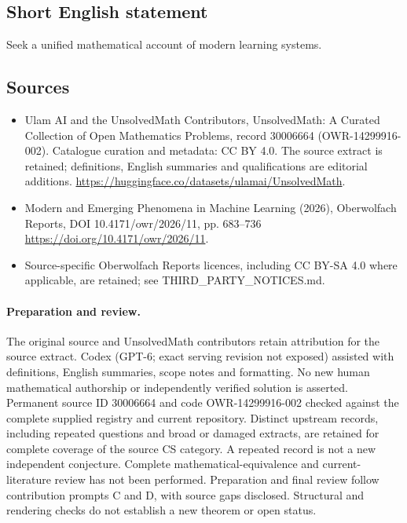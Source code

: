 \documentclass[11pt]{article}
\begin{document}
\subsection{Short English statement}
Seek a unified mathematical account of modern learning systems.
\subsection{Sources}
\begin{itemize}
\item[\hypertarget{source:30006664:1}{S1}] Ulam AI and the UnsolvedMath Contributors, UnsolvedMath: A Curated Collection of Open Mathematics Problems, record 30006664 (OWR-14299916-002). Catalogue curation and metadata: CC BY 4.0. The source extract is retained; definitions, English summaries and qualifications are editorial additions.
\url{https://huggingface.co/datasets/ulamai/UnsolvedMath}.
\item[\hypertarget{source:30006664:2}{S2}] Modern and Emerging Phenomena in Machine Learning (2026), Oberwolfach Reports, DOI 10.4171/owr/2026/11, pp. 683--736
\url{https://doi.org/10.4171/owr/2026/11}.
\item Source-specific Oberwolfach Reports licences, including CC BY-SA 4.0 where applicable, are retained; see THIRD\_PARTY\_NOTICES.md.
\end{itemize}
\paragraph{Preparation and review.}
The original source and UnsolvedMath contributors retain attribution for the source extract. Codex (GPT-6; exact serving revision not exposed) assisted with definitions, English summaries, scope notes and formatting. No new human mathematical authorship or independently verified solution is asserted. Permanent source ID 30006664 and code OWR-14299916-002 checked against the complete supplied registry and current repository. Distinct upstream records, including repeated questions and broad or damaged extracts, are retained for complete coverage of the source CS category. A repeated record is not a new independent conjecture. Complete mathematical-equivalence and current-literature review has not been performed. Preparation and final review follow contribution prompts C and D, with source gaps disclosed. Structural and rendering checks do not establish a new theorem or open status.
\label{end:30006664}
\end{document}
